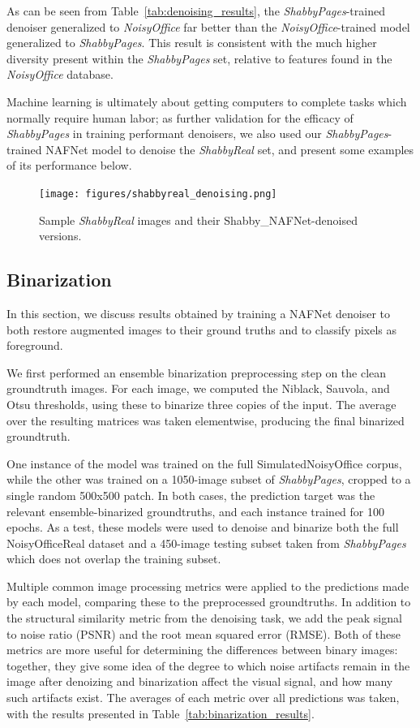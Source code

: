 \documentclass[runningheads]{llncs}
\begin{document}
As can be seen from Table~\ref{tab:denoising_results}, the \emph{ShabbyPages}-trained denoiser generalized to \emph{NoisyOffice} far better than the \emph{NoisyOffice}-trained model generalized to \emph{ShabbyPages}. This result is consistent with the much higher diversity present within the \emph{ShabbyPages} set, relative to features found in the \emph{NoisyOffice} database.

Machine learning is ultimately about getting computers to complete tasks which normally require human labor; as further validation for the efficacy of \emph{ShabbyPages} in training performant denoisers, we also used our \emph{ShabbyPages}-trained NAFNet model to denoise the \emph{ShabbyReal} set, and present some examples of its performance below.

\begin{figure}
\centering
\texttt{[image: figures/shabbyreal\_denoising.png]}
\caption{Sample \emph{ShabbyReal} images and their Shabby\_NAFNet-denoised versions.}
\label{fig:shabbyreal_denoising}
\end{figure}

\subsection{Binarization}
In this section, we discuss results obtained by training a NAFNet denoiser to both restore augmented images to their ground truths and to classify pixels as foreground.

We first performed an ensemble binarization preprocessing step on the clean groundtruth images.
For each image, we computed the Niblack, Sauvola, and Otsu thresholds, using these to binarize three copies of the input. The average over the resulting matrices was taken elementwise, producing the final binarized groundtruth.

One instance of the model was trained on the full SimulatedNoisyOffice corpus, while the other was trained on a 1050-image subset of \emph{ShabbyPages}, cropped to a single random 500x500 patch. In both cases, the prediction target was the relevant ensemble-binarized groundtruths, and each instance trained for 100 epochs.
As a test, these models were used to denoise and binarize both the full NoisyOfficeReal dataset and a 450-image testing subset taken from \emph{ShabbyPages} which does not overlap the training subset.

Multiple common image processing metrics were applied to the predictions made by each model, comparing these to the preprocessed groundtruths.
In addition to the structural similarity metric from the denoising task, we add the peak signal to noise ratio (PSNR) and the root mean squared error (RMSE). Both of these metrics are more useful for determining the differences between binary images: together, they give some idea of the degree to which noise artifacts remain in the image after denoizing and binarization affect the visual signal, and how many such artifacts exist.
The averages of each metric over all predictions was taken, with the results presented in Table~\ref{tab:binarization_results}.
\end{document}
